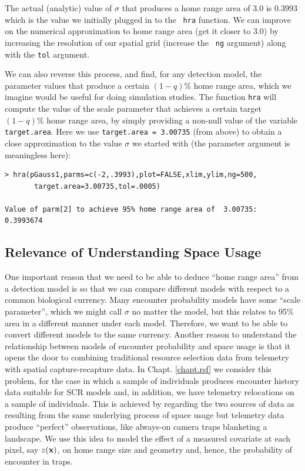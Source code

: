 The actual
(analytic) value of $\sigma$ that produces a home range area of 3.0 is
$0.3993$ which is the value we initially plugged in to the \mbox{\tt
  hra} function. We can improve on the numerical approximation to home range
area (get it closer to $3.0$) by increasing
the resolution of our spatial grid (increase the \mbox{\tt
  ng} argument) along with the \mbox{\tt tol} argument.

We can also reverse this process, and find, for any detection model,
the parameter values that produce a certain $(1-q)$\% home range
area, which we imagine would be useful for doing simulation studies.
The function \mbox{\tt hra} will compute the value of the scale parameter
that achieves a certain target $(1-q)\%$ home range area, by
simply providing a non-null value of the variable \mbox{\tt
  target.area}. Here we use \mbox{\tt target.area = 3.00735} (from
above) to obtain a close approximation to the value $\sigma$ we
started with (the parameter argument is meaningless here):
{\small
\begin{verbatim}
> hra(pGauss1,parms=c(-2,.3993),plot=FALSE,xlim,ylim,ng=500,
       target.area=3.00735,tol=.0005)

Value of parm[2] to achieve 95% home range area of  3.00735:  0.3993674
\end{verbatim}
}

\subsection{Relevance of Understanding Space Usage}

One important reason that we need to be able to deduce ``home range
area'' from a detection model is so that we can compare different
models with respect to a common biological currency.
Many encounter probability models have some ``scale parameter'', which
we might call $\sigma$ no matter the model, but this
relates to 95\% area in a different manner under each model.
Therefore, we want to be able to convert different models to the
same currency.
Another reason to understand the relationship between models of
encounter probability and space usage is that it opens the door to
combining traditional resource selection data from telemetry with
spatial capture-recapture data.  In Chapt. \ref{chapt.rsf} we consider
this problem, for the case in which a sample of individuals produces
encounter history data suitable for SCR models and, in addition, we
have telemetry relocations on a sample of individuals. This is
achieved by regarding the two sources of data as resulting from the
same underlying process of space usage but telemetry data produce
``perfect'' observations, like always-on camera traps blanketing a
landscape.  We use this idea to model the effect of a measured
covariate at each pixel, say $z({\bf x})$, on home range size and geometry
and, hence, the probability of encounter in traps.



